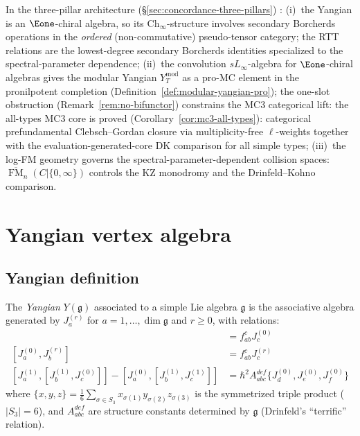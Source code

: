 \begin{remark}
\label{rem:yangian-three-pillar}
In the three-pillar architecture
\ifannalsedition\else
(\S\ref{sec:concordance-three-pillars})
\fi:
(i)~the Yangian is an $\Eone$-chiral algebra, so its
$\mathrm{Ch}_\infty$-structure involves secondary Borcherds operations
in the \emph{ordered} (non-commutative) pseudo-tensor category;
the RTT relations are the lowest-degree secondary Borcherds identities
specialized to the spectral-parameter dependence;
(ii)~the convolution $sL_\infty$-algebra for $\Eone$-chiral algebras
gives the modular Yangian $Y_T^{\mathrm{mod}}$ as a pro-MC element
in the pronilpotent completion
(Definition~\ref{def:modular-yangian-pro}); the one-slot obstruction
\ifannalsedition\else
(Remark~\ref{rem:no-bifunctor})
\fi constrains the MC3 categorical lift:
the all-types MC3 core is proved
\textup{(}Corollary~\ref{cor:mc3-all-types}\textup{)}: categorical
prefundamental Clebsch--Gordan closure via multiplicity-free
$\ell$-weights together with the evaluation-generated-core DK
comparison for all simple types;
(iii)~the log-FM geometry governs the spectral-parameter-dependent
collision spaces: $\overline{\operatorname{FM}}_n(C|\{0,\infty\})$
controls the KZ monodromy and the Drinfeld--Kohno comparison.
\end{remark}

\section{Yangian vertex algebra}
\label{sec:yangian-vertex}

\subsection{Yangian definition}

\begin{definition}[Yangian]\label{def:yangian}
The \emph{Yangian} $Y(\mathfrak{g})$ associated to a simple Lie algebra $\mathfrak{g}$
is the associative algebra generated by $J^{(r)}_a$ for $a = 1, \ldots, \dim\mathfrak{g}$
and $r \geq 0$, with relations:
\begin{align*}
[J^{(0)}_a, J^{(0)}_b] &= f_{ab}^c J^{(0)}_c \\
[J^{(0)}_a, J^{(r)}_b] &= f_{ab}^c J^{(r)}_c \\
[J^{(1)}_a, [J^{(1)}_b, J^{(0)}_c]] - [J^{(0)}_a, [J^{(1)}_b, J^{(1)}_c]] &= \hbar^2 A_{abc}^{def} \{J^{(0)}_d, J^{(0)}_e, J^{(0)}_f\}
\end{align*}
where $\{x,y,z\} = \frac{1}{6}\sum_{\sigma \in S_3} x_{\sigma(1)}y_{\sigma(2)}z_{\sigma(3)}$ is the symmetrized triple product ($|S_3| = 6$), and $A_{abc}^{def}$ are structure constants determined by $\mathfrak{g}$ (Drinfeld's ``terrific'' relation).
\end{definition}

